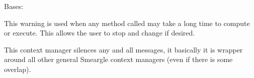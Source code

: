 \documentclass[letterpaper,10pt,english]{sphinxmanual}
\begin{document}

\begin{fulllineitems}
\label{\detokenize{python_docstrings/IfA_Smeargle.meta.errors:IfA_Smeargle.meta.errors.TimeWarning}}
Bases: {\hyperref[\detokenize{python_docstrings/IfA_Smeargle.meta.errors:IfA_Smeargle.meta.errors.Smeargle_Warning}]{}}

This warning is used when any method called may take a long time to
compute or execute. This allows the user to stop and change if desired.

\end{fulllineitems}


\begin{fulllineitems}
\label{\detokenize{python_docstrings/IfA_Smeargle.meta.errors:IfA_Smeargle.meta.errors.smeargle_absolute_silence}}
This context manager silences any and all messages, it basically
it is wrapper around all other general Smeargle context managers (even
if there is some overlap).

\end{fulllineitems}

\end{document}
